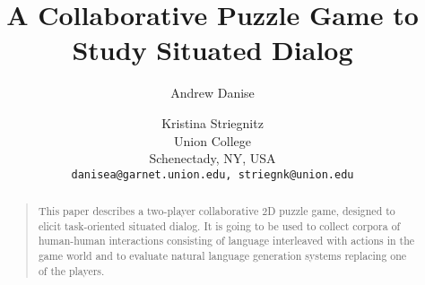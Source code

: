 \documentclass[letterpaper]{article}
\begin{document}
%
\title{A Collaborative Puzzle Game to Study Situated Dialog}
\author{
Andrew Danise \and Kristina Striegnitz\\
Union College\\
Schenectady, NY, USA\\
\texttt{danisea@garnet.union.edu, striegnk@union.edu}
}
\maketitle
\begin{abstract}
\begin{quote}
This paper describes a two-player collaborative 2D puzzle game,
designed to elicit task-oriented situated dialog. It is going to be
used to collect corpora of human-human interactions consisting of
language interleaved with actions in the game world and to evaluate natural
language generation systems replacing one of the players.
\end{quote}
\end{abstract}











\end{document}

